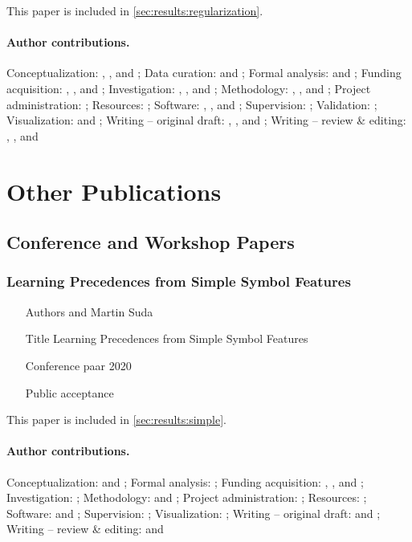 This paper is included in \cref{sec:results:regularization}.

\paragraph{Author contributions.}
Conceptualization:            \MS{}, \FB{}, and \KC{};
Data curation:                \FB{} and \MS{};
Formal analysis:              \FB{} and \MS{};
Funding acquisition:          \MS{}, \JU{}, and \FB{};
Investigation:                \FB{}, \MS{}, and \KC{};
Methodology:                  \MS{}, \FB{}, and \KC{};
Project administration:       \MS{};
Resources:                    \JU{};
Software:                     \FB{}, \MS{}, and \KC{};
Supervision:                  \MS{};
Validation:                   \FB{};
Visualization:                \FB{} and \MS{};
Writing -- original draft:    \MS{}, \FB{}, and \KC{};
Writing -- review \& editing: \FB{}, \MS{}, and \KC{}

\section{Other Publications}

\subsection{Conference and Workshop Papers}

\subsubsection{Learning Precedences from Simple Symbol Features}

\begin{itemize}
\item[Authors]  and Martin Suda
\item[Title] Learning Precedences from Simple Symbol Features \cite{DBLP:conf/cade/Bartek020}
\item[Conference] \Acrfull{paar} 2020
\item[Public acceptance] 
\end{itemize}

This paper is included in \cref{sec:results:simple}.

\paragraph{Author contributions.}
Conceptualization:            \MS{} and \FB{};
Formal analysis:              \FB{};
Funding acquisition:          \JU{}, \MS{}, and \FB{};
Investigation:                \FB{};
Methodology:                  \MS{} and \FB{};
Project administration:       \MS{};
Resources:                    \JU{};
Software:                     \FB{} and \MS{};
Supervision:                  \MS{};
Visualization:                \FB{};
Writing -- original draft:    \FB{} and \MS{};
Writing -- review \& editing: \FB{} and \MS{}

